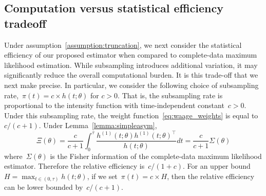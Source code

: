 \documentclass[11pt]{amsart}
\newtheorem{prop}[thm]{Proposition}
\begin{document}


\subsection{Computation versus statistical efficiency tradeoff}

Under assumption~\ref{assumption:truncation}, we next consider the statistical efficiency of our proposed estimator when compared to complete-data maximum likelihood estimation. While subsampling introduces additional variation, it may significantly reduce the overall computational burden. It is this trade-off that we next make precise. In particular, we consider the following choice of subsampling rate,~$\pi(t) = c \times h(t; \theta)$ for $c>0$. That is, the subsampling rate is proportional to the intensity function with time-independent constant~$c > 0$. Under this subsampling rate, the weight function~\eqref{eq:waage_weights} is equal to $c/ (c+1)$. Under Lemma~\ref{lemma:simpleasym},
\[
\Xi (\theta) = \frac{c}{c+1} \int_0^\tau \frac{ h^{(1)} (t; \theta)
  h^{(1)} (t; \theta)^\top}{h (t; \theta)} dt = \frac{c}{c+1} \Sigma (\theta)
\]
where~$\Sigma(\theta)$ is the Fisher information of the complete-data maximum likelihood estimator.
Therefore the relative efficiency is~$c/(1+c)$. For an upper bound~$H = \max_{t \in (0,\tau)} h(t;\theta)$, if we set~$\pi (t) = c \times H$, then the relative efficiency can be lower bounded by~$c / (c+1)$.
\end{document}
